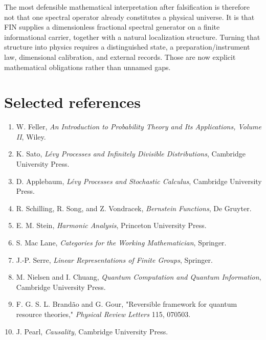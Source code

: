 \documentclass[11pt,a4paper,openany]{report}
\begin{document}
The most defensible mathematical interpretation after falsification is therefore not that one spectral operator already constitutes a physical universe. It is that FIN supplies a dimensionless fractional spectral generator on a finite informational carrier, together with a natural localization structure. Turning that structure into physics requires a distinguished state, a preparation/\allowbreak{}instrument law, dimensional calibration, and external records. Those are now explicit mathematical obligations rather than unnamed gaps.

\chapter{Selected references}

\begin{enumerate}
\item 
W. Feller, \emph{An Introduction to Probability Theory and Its Applications, Volume II}, Wiley.

\item 
K. Sato, \emph{Lévy Processes and Infinitely Divisible Distributions}, Cambridge University Press.

\item 
D. Applebaum, \emph{Lévy Processes and Stochastic Calculus}, Cambridge University Press.

\item 
R. Schilling, R. Song, and Z. Vondracek, \emph{Bernstein Functions}, De Gruyter.

\item 
E. M. Stein, \emph{Harmonic Analysis}, Princeton University Press.

\item 
S. Mac Lane, \emph{Categories for the Working Mathematician}, Springer.

\item 
J.-P. Serre, \emph{Linear Representations of Finite Groups}, Springer.

\item 
M. Nielsen and I. Chuang, \emph{Quantum Computation and Quantum Information}, Cambridge University Press.

\item 
F. G. S. L. Brandão and G. Gour, "Reversible framework for quantum resource theories," \emph{Physical Review Letters} 115, 070503.

\item 
J. Pearl, \emph{Causality}, Cambridge University Press.

\end{enumerate}
\end{document}
